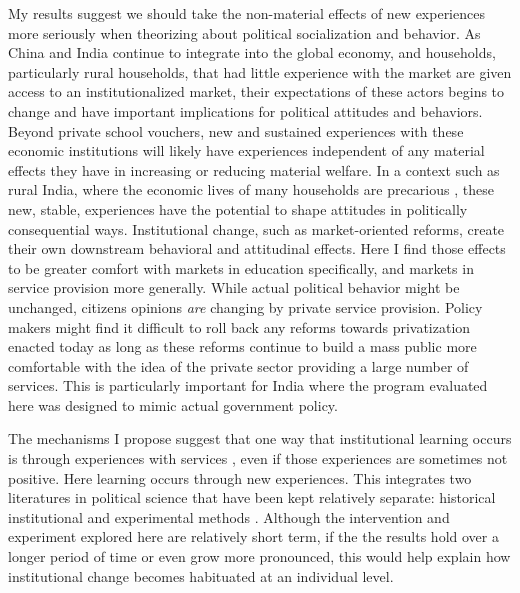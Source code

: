 \documentclass[hidelinks, 12pt, titlepage]{article}
\begin{document}
	My results suggest we should take the non-material effects of new experiences more seriously when theorizing about political socialization and behavior.  As China and India continue to integrate into the global economy, and households, particularly rural households, that had little experience with the market are given access to an institutionalized market, their expectations of these actors begins to change and have important implications for political attitudes and behaviors.  Beyond private school vouchers, new and sustained experiences with these economic institutions will likely have experiences independent of any material effects they have in increasing or reducing material welfare.  In a context such as rural India, where the economic lives of many households are precarious \citep{Gupta2012,Krishna2010}, these new, stable, experiences have the potential to shape attitudes in politically consequential ways.  Institutional change, such as market-oriented reforms, create their own downstream behavioral and attitudinal effects.  Here I find those effects to be greater comfort with markets in education specifically, and markets in service provision more generally.  While actual political behavior might be unchanged, citizens opinions \emph{are} changing by private service provision.  Policy makers might find it difficult to roll back any reforms towards privatization enacted today as long as these reforms continue to build a mass public more comfortable with the idea of the private sector providing a large number of services.  This is particularly important for India where the program evaluated here was designed to mimic actual government policy.

	The mechanisms I propose suggest that one way that institutional learning occurs is through experiences with services \citep{Pierson2000b}, even if those experiences are sometimes not positive. Here learning occurs through new experiences.  This integrates two literatures in political science that have been kept relatively separate: historical institutional and experimental methods \citep{Steinmo2015}.  Although the intervention and experiment explored here are relatively short term, if the the results hold over a longer period of time or even grow more pronounced, this would help explain how institutional change becomes habituated at an individual level.
\end{document}
